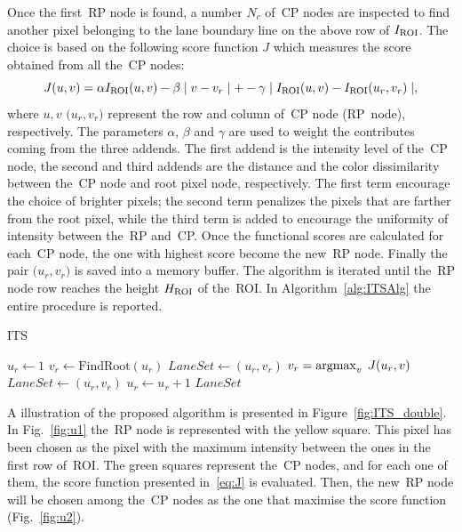 Once the first~\gls{RP}  node is found, a number $N_c$ of~\gls{CP}  nodes are inspected to find another pixel belonging to the lane boundary line on the above row of $I_{\rm ROI}$. The choice is based on the following score function $J$ which measures the score obtained from all the~\gls{CP}  nodes:
%
\begin{equation} \label{eq:J}
		J(u,v)= \alpha I_{\rm ROI}(u,v) - \beta \mid v - v_r \mid +
		-\gamma \mid I_{\rm ROI}(u,v)-I_{\rm ROI}(u_r,v_r) \mid,
\end{equation}
%
where $u,v$  $\big(u_r,v_r\big)$ represent the row and column of~\gls{CP} node \mbox{(\gls{RP} node)}, respectively. The parameters $\alpha$, $\beta$ and $\gamma$ are used to weight the contributes coming from the three addends. The first addend is the intensity level of the~\gls{CP} node, the second and third addends are the distance and the color dissimilarity between the~\gls{CP} node and root pixel node, respectively. 
The first term encourage the choice of brighter pixels; the second term penalizes the pixels that are farther from the root pixel, while the third term is added to encourage the uniformity of intensity between the~\gls{RP} and~\gls{CP}.
Once the functional scores are calculated for each~\gls{CP} node, the one with highest score become the new~\gls{RP} node. Finally the pair $\big(u_r, v_r \big)$ is saved into a memory buffer. The algorithm is iterated until the~\gls{RP} node row reaches the height $H_{\rm ROI}$ of the~\gls{ROI}. In Algorithm~\ref{alg:ITSAlg} the entire procedure is reported.

\begin{algorithm}
	\caption{ITS}\label{alg:ITSAlg}
	\begin{algorithmic}[1]
		\State  $u_r \gets 1$
		\State   $v_r \gets \text{FindRoot}(u_r)$
		\State $LaneSet \gets (u_r,v_r) $
		\State {}
		\EndFor
		\State $v_r = \operatorname*{argmax}_v \; J(u_r,v)$
		\State $LaneSet \gets (u_r,v_r) $
		\State  $u_r \gets u_r +1$
		\EndWhile
		\State \Return $LaneSet$
	\end{algorithmic}
\end{algorithm} 


\noindent A illustration of the proposed algorithm is presented in Figure~\ref{fig:ITS_double}. In  Fig.~\ref{fig:u1} the~\gls{RP} node is represented with the yellow square. This pixel has been chosen as the pixel with the maximum intensity between the ones in the first row of~\gls{ROI}. The green squares represent the~\gls{CP} nodes, and for each one of them, the score function presented in~\eqref{eq:J} is evaluated. Then, the new~\gls{RP} node will be chosen among the~\gls{CP} nodes as the one that maximise the score function (Fig.~\ref{fig:u2}).

